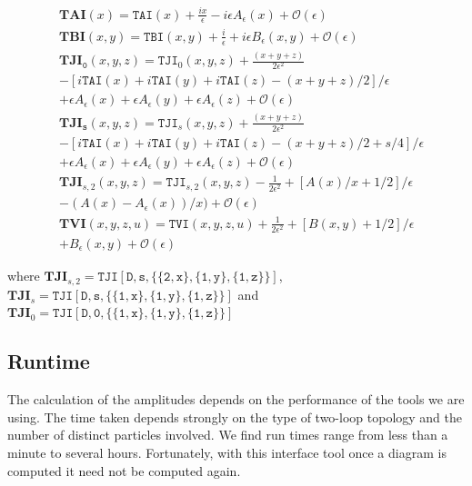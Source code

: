 \begin{align*}
&\mathtt{\mathbf{TAI} }(x)= \mathtt{TAI}(x)+\frac{ix}{\epsilon} -i\epsilon A_{\epsilon}(x) + \mathcal{O}(\epsilon)\\
&\mathtt{\mathbf{TBI} }(x,y)= \mathtt{TBI}(x,y)+\frac{i}{\epsilon} + i\epsilon B_{\epsilon}(x,y) + \mathcal{O}(\epsilon)\\
&\mathtt{\mathbf{TJI}_0 }(x,y,z)= \mathtt{TJI}_0(x,y,z)+\frac{(x+y+z)}{2\epsilon^2}  \\ & -\left[i\mathtt{TAI}(x)+i\mathtt{TAI}(y)+i\mathtt{TAI}(z)-(x+y+z)/2\right]/\epsilon\\&+ \epsilon A_{\epsilon}(x)+\epsilon A_{\epsilon}(y)+\epsilon A_{\epsilon}(z) +  \mathcal{O}(\epsilon)\\
&\mathtt{\mathbf{TJI}_s }(x,y,z)= \mathtt{TJI}_s(x,y,z)+\frac{(x+y+z)}{2\epsilon^2}  \\ & -\left[i\mathtt{TAI}(x)+i\mathtt{TAI}(y)+i\mathtt{TAI}(z)-(x+y+z)/2+s/4\right]/\epsilon\\&+ \epsilon A_{\epsilon}(x)+\epsilon A_{\epsilon}(y)+\epsilon A_{\epsilon}(z) + \mathcal{O}(\epsilon)\\
&\mathtt{\mathbf{TJI}}_{s,2}(x,y,z)= \mathtt{TJI}_{s,2}(x,y,z) -\frac{1}{2\epsilon^2} +\left[A(x)/x +1/2\right]/\epsilon\\ &- (A(x)- A_{\epsilon}(x))/x)+\mathcal{O}(\epsilon) \\
&\mathtt{\mathbf{TVI}}(x,y,z,u)= \mathtt{TVI}(x,y,z,u) +\frac{1}{2\epsilon^2} +\left[B(x,y) +1/2\right]/\epsilon\\ &+ B_{\epsilon}(x,y)+\mathcal{O}(\epsilon)
\end{align*}

where $\mathtt{\mathbf{TJI}}_{s,2}= \mathtt{TJI[D,s,\{\{2,x\}, \{1,y\}, \{1,z\}\}]}$, $\mathtt{\mathbf{TJI}}_{s}= \mathtt{TJI[D,s,\{\{1,x\}, \{1,y\}, \{1,z\}\}]}$ and $\mathtt{\mathbf{TJI}}_{0}= \mathtt{TJI[D,0,\{\{1,x\}, \{1,y\}, \{1,z\}\}]}$




\subsection{Runtime}

The calculation of the amplitudes depends on the performance of the tools we are using.  The time taken depends strongly on the type of two-loop topology and the number of distinct particles involved.  We find run times range from less than a minute to several hours.  Fortunately, with this interface tool once a diagram is computed it need not be computed again.

